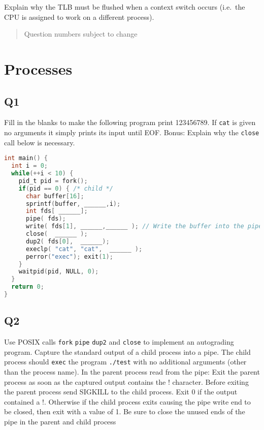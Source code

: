 Explain why the TLB must be flushed when a context switch occurs (i.e.~the CPU is assigned to work on a different process).

\begin{quote}
Question numbers subject to change
\end{quote}

\section{Processes}

\subsection{Q1}\label{q1-3}

Fill in the blanks to make the following program print 123456789. If \texttt{cat} is given no arguments it simply prints its input until EOF. Bonus: Explain why the \texttt{close} call below is necessary.

\begin{lstlisting}[language=C]
int main() {
  int i = 0;
  while(++i < 10) {
    pid_t pid = fork();
    if(pid == 0) { /* child */
      char buffer[16];
      sprintf(buffer, ______,i);
      int fds[ ______];
      pipe( fds);
      write( fds[1], ______,______ ); // Write the buffer into the pipe
      close(  ______ );
      dup2( fds[0],  ______);
      execlp( "cat", "cat",  ______ );
      perror("exec"); exit(1);
    }
    waitpid(pid, NULL, 0);
  }
  return 0;
}
\end{lstlisting}

\subsection{Q2}\label{q2-3}

Use POSIX calls \texttt{fork} \texttt{pipe} \texttt{dup2} and \texttt{close} to implement an autograding program. Capture the standard output of a child process into a pipe. The child process should \texttt{exec} the program \texttt{./test} with no additional arguments (other than the process name). In the parent process read from the pipe: Exit the parent process as soon as the captured output contains the ! character. Before exiting the parent process send SIGKILL to the child process. Exit 0 if the output contained a !. Otherwise if the child process exits causing the pipe write end to be closed, then exit with a value of 1. Be sure to close the unused ends of the pipe in the parent and child process

